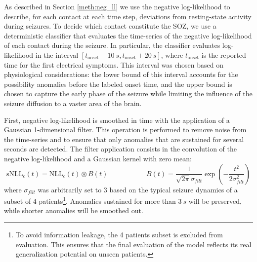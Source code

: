 As described in Section \ref{meth:neg_ll} we use the negative log-likelihood to
describe, for each contact at each time step, deviations from resting-state
activity during seizures.
To decide which contact constitute the SOZ, we use a deterministic classifier
that evaluates the time-series of the negative log-likelihood of each contact 
during the seizure.
In particular, the classifier evaluates log-likelihood in the interval
$[t_{\text{onset}} - 10\ s, t_{\text{onset}} +20\ s]$, where $t_{\text{onset}}$
is the reported time for the first electrical symptoms.
This interval was chosen based on physiological considerations:
the lower bound of this interval accounts for the possibility anomalies before
the labeled onset time, and the upper bound is
chosen to capture the early phase of the seizure while limiting the influence of
the seizure diffusion to a vaster area of the brain.

First, negative log-likelihood is smoothed in time with the application of a 
Gaussian 1-dimensional filter.
This operation is performed to remove noise from the time-series and to 
ensure that only anomalies that are sustained for several seconds are detected.
The filter application consists in the convolution of the negative
log-likelihood and a Gaussian kernel with zero mean:
\begin{equation}
    \text{sNLL}_c(t)=\text{NLL}_c(t)\circledast B(t)
    \;\;\;\;\;\;\;\;\;\;\;\;\;\;\;\;\;\;\;\;
    B(t)=\frac{1}{\sqrt{2\pi}\sigma_{filt}}
    \exp{\left(-\frac{t^2}{2\sigma_{filt}^2}\right)}
\end{equation}
where $\sigma_{filt}$ was arbitrarily set to 3 based on the typical seizure
dynamics of a subset of 4 patients\footnote{
To avoid information leakage, the 4 patients subset is excluded from
evaluation. This ensures that the final evaluation of the model reflects its
real generalization potential on unseen patients.
}.
Anomalies sustained for more than $3\ s$ will be preserved, while shorter 
anomalies will be smoothed out.

